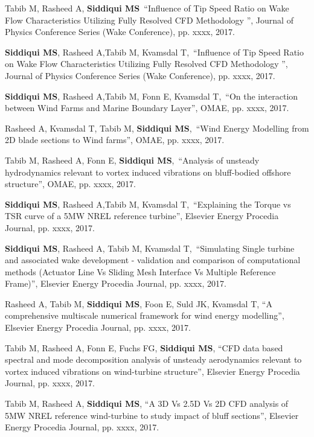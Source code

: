 \begin{cventries}
  \cventry
    {} %
    {} %
    {} %
    {} %
    {
      \begin{cvitems}
\item {Tabib M, Rasheed A, \textbf{Siddiqui MS} “Influence of Tip Speed Ratio on Wake Flow Characteristics Utilizing Fully Resolved CFD Methodology ”, Journal of Physics Conference Series (Wake Conference), pp. xxxx, 2017.}
\item {\textbf{Siddiqui MS}, Rasheed A,Tabib M, Kvamsdal T, “Influence of Tip Speed Ratio on Wake Flow Characteristics Utilizing Fully Resolved CFD Methodology ”, Journal of Physics Conference Series (Wake Conference), pp. xxxx, 2017.}
\item {\textbf{Siddiqui MS}, Rasheed A,Tabib M, Fonn E, Kvamsdal T, “On the interaction between Wind Farms and Marine Boundary Layer”, OMAE, pp. xxxx, 2017.}
\item {Rasheed A, Kvamsdal T, Tabib M, \textbf{Siddiqui MS}, “Wind Energy Modelling from 2D blade sections to Wind farms”, OMAE, pp. xxxx, 2017.}
\item {Tabib M, Rasheed A, Fonn E, \textbf{Siddiqui MS}, “Analysis of unsteady hydrodynamics relevant to vortex induced vibrations on bluff-bodied offshore structure”, OMAE, pp. xxxx, 2017.}
\item {\textbf{Siddiqui MS}, Rasheed A,Tabib M, Kvamsdal T, “Explaining the Torque vs TSR curve of a 5MW NREL reference turbine”, Elsevier Energy Procedia Journal, pp. xxxx, 2017.}
\item {\textbf{Siddiqui MS}, Rasheed A, Tabib M, Kvamsdal T, “Simulating Single turbine and associated wake development - validation and comparison of computational methods (Actuator Line Vs Sliding Mesh Interface Vs Multiple Reference Frame)”, Elsevier Energy Procedia Journal, pp. xxxx, 2017.}
\item {Rasheed A, Tabib M, \textbf{Siddiqui MS}, Foon E, Suld JK, Kvamsdal T, “A comprehensive multiscale numerical framework for wind energy modelling”, Elsevier Energy Procedia Journal, pp. xxxx, 2017.}
\item {Tabib M, Rasheed A, Fonn E, Fuchs FG, \textbf{Siddiqui MS}, “CFD data based spectral and mode decomposition analysis of unsteady aerodynamics relevant to vortex induced vibrations on wind-turbine structure”, Elsevier Energy Procedia Journal, pp. xxxx, 2017.}
\item {Tabib M, Rasheed A, \textbf{Siddiqui MS}, “A 3D Vs 2.5D Vs 2D CFD analysis of 5MW NREL reference wind-turbine to study impact of bluff sections”, Elsevier Energy Procedia Journal, pp. xxxx, 2017.}

\end{cvitems}}
\end{cventries}
